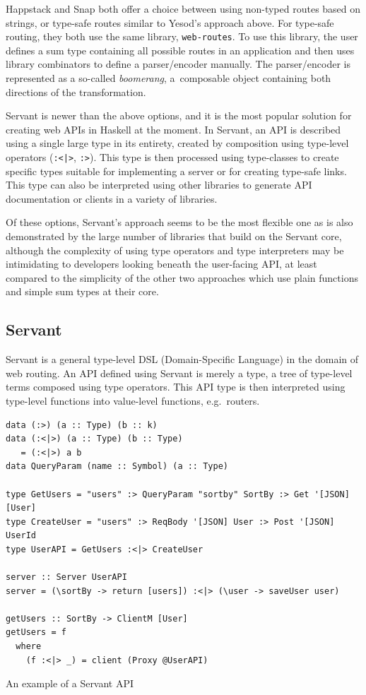 \documentclass[english,zadani,odsaz]{fitthesis}
\begin{document}
Happstack and Snap both offer a choice between using non-typed routes based on
strings, or type-safe routes similar to Yesod's approach above. For type-safe
routing, they both use the same library, \texttt{web-routes}. To use this library, the
user defines a sum type containing all possible routes in an application and
then uses library combinators to define a parser/encoder manually. The
parser/encoder is represented as a so-called \emph{boomerang}, a~composable object
containing both directions of the transformation.

Servant is newer than the above options, and it is the most popular solution for
creating web APIs in Haskell at the moment. In Servant, an API is described
using a single large type in its entirety, created by composition using
type-level operators (\texttt{:<|>}, \texttt{:>}). This type is then processed using type-classes
to create specific types suitable for implementing a server or for creating
type-safe links. This type can also be interpreted using other libraries to
generate API documentation or clients in a variety of libraries.

Of these options, Servant's approach seems to be the most flexible one as is
also demonstrated by the large number of libraries that build on the Servant
core, although the complexity of using type operators and type interpreters may
be intimidating to developers looking beneath the user-facing API, at least
compared to the simplicity of the other two approaches which use plain functions
and simple sum types at their core.

\subsection{Servant}
\label{sec:org6aa912b}
Servant is a general type-level DSL (Domain-Specific Language) in the domain of
web routing. An API defined using Servant is merely a type, a tree of type-level
terms composed using type operators. This API type is then interpreted using
type-level functions into value-level functions, e.g.~routers.

\begin{listing}[tb]
\begin{verbatim}
data (:>) (a :: Type) (b :: k)
data (:<|>) (a :: Type) (b :: Type)
   = (:<|>) a b
data QueryParam (name :: Symbol) (a :: Type)

type GetUsers = "users" :> QueryParam "sortby" SortBy :> Get '[JSON] [User]
type CreateUser = "users" :> ReqBody '[JSON] User :> Post '[JSON] UserId
type UserAPI = GetUsers :<|> CreateUser

server :: Server UserAPI
server = (\sortBy -> return [users]) :<|> (\user -> saveUser user)

getUsers :: SortBy -> ClientM [User]
getUsers = f
  where
    (f :<|> _) = client (Proxy @UserAPI)
\end{verbatim}
\caption{An example of a Servant API \label{servant-api}}
\end{listing}
\end{document}

